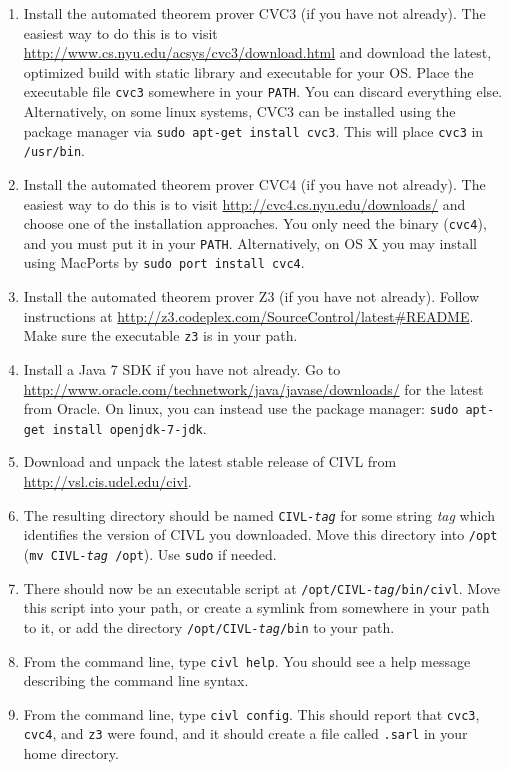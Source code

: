 \begin{enumerate}
\item Install the automated theorem prover CVC3 (if you have not
  already).  The easiest way to do this is to visit
  \url{http://www.cs.nyu.edu/acsys/cvc3/download.html} and download
  the latest, optimized build with static library and executable for
  your OS.  Place the executable file \texttt{cvc3} somewhere in your
  \texttt{PATH}.  You can discard everything else.  Alternatively, on
  some linux systems, CVC3 can be installed using the package manager
  via \texttt{sudo apt-get install cvc3}.  This will place
  \texttt{cvc3} in \texttt{/usr/bin}.

\item Install the automated theorem prover CVC4 (if you have not
  already).  The easiest way to do this is to visit
  \url{http://cvc4.cs.nyu.edu/downloads/} and choose one of the
  installation approaches.  You only need the binary (\texttt{cvc4}),
  and you must put it in your \texttt{PATH}.  Alternatively, on OS X
  you may install using MacPorts by \texttt{sudo port install cvc4}.

\item Install the automated theorem prover Z3 (if you have not
  already).  Follow instructions at
  \url{http://z3.codeplex.com/SourceControl/latest#README}.  Make sure
  the executable \texttt{z3} is in your path.

\item Install a Java 7 SDK if you have not already.  Go to
  \url{http://www.oracle.com/technetwork/java/javase/downloads/} for
  the latest from Oracle.  On linux, you can instead use the package
  manager: \texttt{sudo apt-get install openjdk-7-jdk}.

\item Download and unpack the latest stable release of CIVL from
  \url{http://vsl.cis.udel.edu/civl}.

\item The resulting directory should be named
  \texttt{CIVL-\textit{tag}} for some string \textit{tag} which
  identifies the version of CIVL you downloaded.  Move this directory
  into \texttt{/opt} (\texttt{mv\ CIVL-\textit{tag}\ /opt}).  Use
  \texttt{sudo} if needed.

\item There should now be an executable script at
  \texttt{/opt/CIVL-\textit{tag}/bin/civl}.  Move this script into
  your path, or create a symlink from somewhere in your path to it, or
  add the directory \texttt{/opt/CIVL-\textit{tag}/bin} to your path.

\item From the command line, type \texttt{civl help}.  You should see
  a help message describing the command line syntax.

\item From the command line, type \texttt{civl config}.  This should
  report that \texttt{cvc3}, \texttt{cvc4}, and \texttt{z3} were
  found, and it should create a file called \texttt{.sarl} in your
  home directory.

\end{enumerate}

